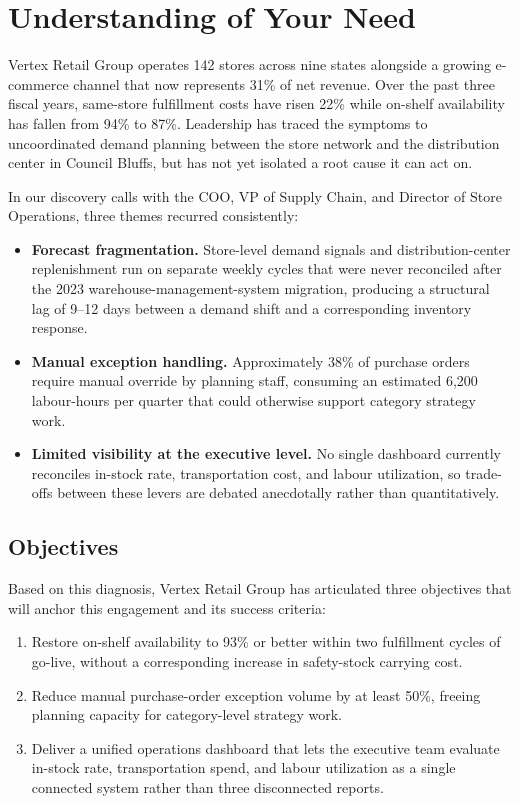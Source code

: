 \section{Understanding of Your Need}

Vertex Retail Group operates 142 stores across nine states alongside a growing
e-commerce channel that now represents 31\% of net revenue. Over the past three
fiscal years, same-store fulfillment costs have risen 22\% while on-shelf
availability has fallen from 94\% to 87\%. Leadership has traced the symptoms to
uncoordinated demand planning between the store network and the distribution
center in Council Bluffs, but has not yet isolated a root cause it can act on.

In our discovery calls with the COO, VP of Supply Chain, and Director of Store
Operations, three themes recurred consistently:

\begin{itemize}[leftmargin=1.4em]
  \item \textbf{Forecast fragmentation.} Store-level demand signals and
    distribution-center replenishment run on separate weekly cycles that were
    never reconciled after the 2023 warehouse-management-system migration,
    producing a structural lag of 9--12 days between a demand shift and a
    corresponding inventory response.
  \item \textbf{Manual exception handling.} Approximately 38\% of purchase
    orders require manual override by planning staff, consuming an estimated
    6,200 labour-hours per quarter that could otherwise support category
    strategy work.
  \item \textbf{Limited visibility at the executive level.} No single dashboard
    currently reconciles in-stock rate, transportation cost, and labour
    utilization, so trade-offs between these levers are debated anecdotally
    rather than quantitatively.
  \end{itemize}

\subsection{Objectives}

Based on this diagnosis, Vertex Retail Group has articulated three objectives
that will anchor this engagement and its success criteria:

\begin{enumerate}[leftmargin=1.4em]
  \item Restore on-shelf availability to 93\% or better within two fulfillment
    cycles of go-live, without a corresponding increase in safety-stock carrying
    cost.
  \item Reduce manual purchase-order exception volume by at least 50\%,
    freeing planning capacity for category-level strategy work.
  \item Deliver a unified operations dashboard that lets the executive team
    evaluate in-stock rate, transportation spend, and labour utilization as a
    single connected system rather than three disconnected reports.
  \end{enumerate}


